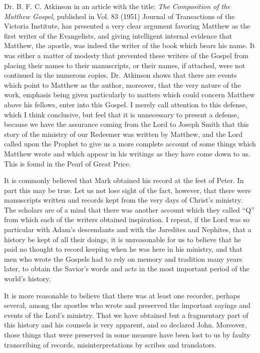 Dr. B. F. C. Atkinson in an article with the title: \textit{The Composition of the Matthew Gospel},
published in Vol. 83 (1951) {Journal of Transactions of the Victoria Institute}, has presented a
very clear argument favoring Matthew as the first writer of the Evangelists, and giving
intelligent internal evidence that Matthew, the apostle, was indeed the writer of the book
which bears his name. It was either a matter of modesty that prevented these writers of the
Gospel from placing their names to their manuscripts, or their names, if attached, were not
continued in the numerous copies. Dr. Atkinson shows that there are events which point to
Matthew as the author, moreover, that the very nature of the work, emphasis being given
particularly to matters which could concern Matthew above his fellows, enter into this
Gospel. I merely call attention to this defense, which I think conclusive, but feel that it is
unnecessary to present a defense, because we have the assurance coming from the Lord to
Joseph Smith that this story of the ministry of our Redeemer was written by Matthew, and
the Lord called upon the Prophet to give us a more complete account of some things which
Matthew wrote and which appear in his writings as they have come down to us. This is found
in the Pearl of Great Price.

It is commonly believed that Mark obtained his record at the feet of Peter. In part this may be
true. Let us not lose sight of the fact, however, that there were manuscripts written and
records kept from the very days of Christ's ministry. The scholars are of a mind that there
was another account which they called ``Q'' from which each of the writers obtained
inspiration. I repeat, if the Lord was so particular with Adam's descendants and with the
Jaredites and Nephites, that a history be kept of all their doings, it is unreasonable for us to
believe that he paid no thought to record keeping when he was here in his ministry, and that
men who wrote the Gospels had to rely on memory and tradition many years later, to obtain
the Savior's words and acts in the most important period of the world's history.

It is more reasonable to believe that there was at least one recorder, perhaps several, among
the apostles who wrote and preserved the important sayings and events of the Lord's
ministry. That we have obtained but a fragmentary part of this history and his counsels is
very apparent, and so declared John. Moreover, those things that were preserved in some
measure have been lost to us by faulty transcribing of records, misinterpretations by scribes
and translators.

